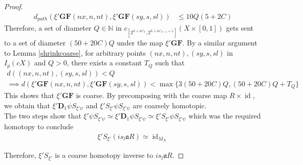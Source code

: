 \documentclass[10pt,a4paper]{amsart}
\DeclareMathOperator{\id}{id}
\begin{document}
\begin{proof}
\begin{align*}
d_{path}(\xi'\mathbf{GF}(nx,n,nt),\xi'\mathbf{GF}(sy,s,sl))&\leq 10Q(5+2C)
\end{align*}
Therefore, a set of diameter $Q\in \mathbb{N}$ in $c_{[2^{h+m'_{h}},2^{h+m'_{h+1}+1}]}(X \times [0,1])$ gets sent to a set of diameter $(50+20C)Q$ under the map $\xi' \mathbf{GF}$. By a similar argument to Lemma \ref{shrinkcoarse}, for arbitrary points $(nx,n,nt),(sy,s,sl)$ in $I_{p}(cX)$ and $Q>0$, there exists a constant $T_{Q}$ such that 
\begin{align*}
d((nx,n,nt),(sy,s,sl))<Q \\
\implies d(\xi' \mathbf{GF}(nx,n,nt),\xi'  \mathbf{GF}(sy,s,sl)) < \max\{3(50+20C)Q, (50+20C)Q+T_{Q}\}
\end{align*} This shows that $\xi' \mathbf{GF}$ is coarse. By precomposing with the coarse map $R \times \id$, we obtain that $\xi' \mathbf{D}_{1} \psi S_{\xi' \psi}$ and $\xi' S_{\xi'} \psi S_{\xi' \psi}$ are coarsely homotopic. \\

The two steps show that $\xi' \psi S_{\xi'\psi}\simeq \xi' \mathbf{D}_{1} \psi S_{\xi' \psi}\simeq \xi' S_{\xi'} \psi S_{\xi' \psi}$ which was the required homotopy to conclude 
\begin{align*}
\xi' S_{\xi'} (is_{l}\mathfrak{a}R) \simeq \id_{M_{X}}
\end{align*}

Therefore, $\xi' S_{\xi'}$ is a coarse homotopy inverse to $is_{l}\mathfrak{a}R$. 
\end{proof}
\end{document}
